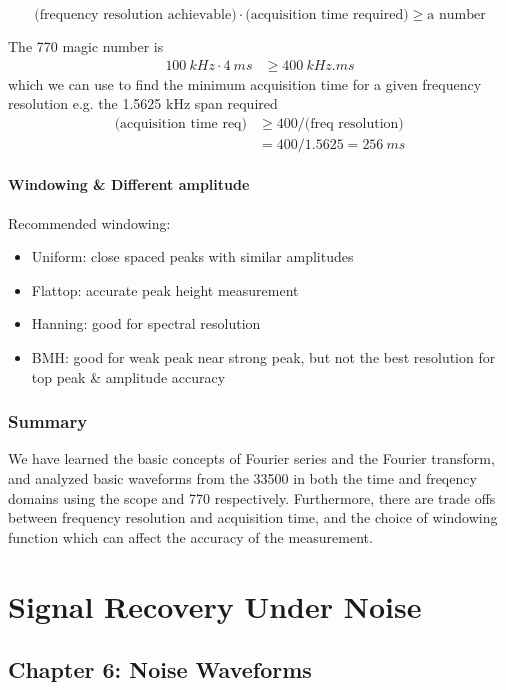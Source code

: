 \documentclass[../main.tex]{subfiles}
\begin{document}
\[\textrm{(frequency resolution achievable)} \cdot \textrm{(acquisition time required)} \geq  \textrm{a number}\]

The 770 magic number is
\begin{align*}
    \qty{100}{kHz} \cdot \qty{4}{ms} &\geq \qty{400}{kHz.ms}
\end{align*}
which we can use to find the minimum acquisition time for a given frequency resolution e.g. the 1.5625 kHz span required
\begin{align*}
    \textrm{(acquisition time req)} &\geq 400 / \textrm{(freq resolution)} \\
    &= 400 / 1.5625 = \qty{256}{ms}
\end{align*}

\paragraph*{Windowing \& Different amplitude}

Recommended windowing:
\begin{itemize}
    \item Uniform: close spaced peaks with similar amplitudes
    \item Flattop: accurate peak height measurement
    \item Hanning: good for spectral resolution
    \item BMH: good for weak peak near strong peak, but not the best resolution for top peak \& amplitude accuracy
\end{itemize}

\subsubsection*{Summary} 

We have learned the basic concepts of Fourier series and the Fourier transform, and analyzed basic waveforms from the 33500
in both the time and freqency domains using the scope and 770 respectively.
Furthermore, there are trade offs between frequency resolution and acquisition time,
and the choice of windowing function which can affect the accuracy of the measurement.
\newpage
{}
\section{Signal Recovery Under Noise}

\subsection*{Chapter 6: Noise Waveforms}
\end{document}
